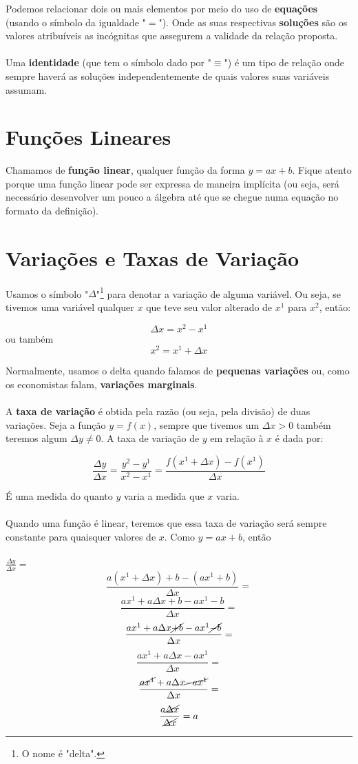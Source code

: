 \documentclass[a4paper,11pt,oneside]{book}
\theoremstyle{definition}
\theoremstyle{break}
\begin{document}
Podemos relacionar dois ou mais elementos por meio do uso de \textbf{equações} (usando o símbolo da igualdade "$=$"). Onde as suas respectivas \textbf{soluções} são os valores atribuíveis as incógnitas que assegurem a validade da relação proposta.
\\~\\
Uma \textbf{identidade} (que tem o símbolo dado por "$\equiv$") é um tipo de relação onde sempre haverá as soluções independentemente de quais valores suas variáveis assumam.

\section*{Funções Lineares}

Chamamos de \textbf{função linear}, qualquer função da forma $y = ax + b$. Fique atento porque uma função linear pode ser expressa de maneira implícita (ou seja, será necessário desenvolver um pouco a álgebra até que se chegue numa equação no formato da definição).

\section*{Variações e Taxas de Variação}

Usamos o símbolo "$\Delta$"\footnote{O nome é "delta".} para denotar a variação de alguma variável. Ou seja, se tivemos uma variável qualquer $x$ que teve seu valor alterado de $x^1$ para $x^2$, então:

$$ \Delta x = x^2 - x^1 $$
ou também
$$ x^2 = x^1 + \Delta x $$

Normalmente, usamos o delta quando falamos de \textbf{pequenas variações} ou, como os economistas falam, \textbf{variações marginais}.
\\~\\
A \textbf{taxa de variação} é obtida pela razão (ou seja, pela divisão) de duas variações. Seja a função $y = f(x)$, sempre que tivemos um $\Delta x > 0$ também teremos algum $\Delta y \neq 0$. A taxa de variação de $y$ em relação à $x$ é dada por:

$$ \frac{\Delta y}{\Delta x} = \frac{y^2 - y^1}{x^2 - x^1} = \frac{f(x^1 + \Delta x) - f(x^1)}{\Delta x} $$

É uma medida do quanto $y$ varia a medida que $x$ varia.
\\~\\
Quando uma função é linear, teremos que essa taxa de variação será sempre constante para quaisquer valores de $x$. Como $y = ax + b$, então
\\~\\
\Large $ \frac{\Delta y}{\Delta x} = $ \normalsize
$$ \frac{a(x^1 + \Delta x) + b - (ax^1 + b)}{\Delta x} = $$
$$ \frac{ax^1 + a\Delta x + b - ax^1 - b}{\Delta x} = $$
$$ \frac{ax^1 + a\Delta x \cancel{+ b} - ax^1 \cancel{- b}}{\Delta x} = $$
$$ \frac{ax^1 + a\Delta x - ax^1}{\Delta x} = $$
$$ \frac{\cancel{ax^1} + a\Delta x \cancel{- ax^1}}{\Delta x} = $$
$$ \frac{a \cancel{\Delta x}}{\cancel{\Delta x}} = a$$
\end{document}
